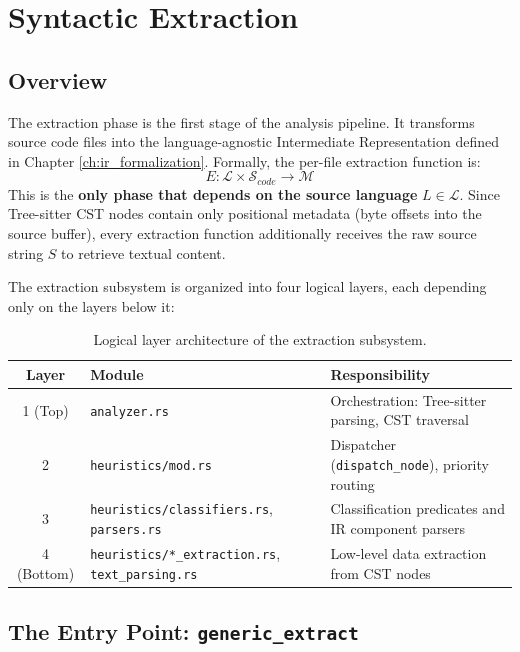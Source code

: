 \chapter{Syntactic Extraction}
\label{ch:extraction}

\section{Overview}
\label{sec:extraction_overview}

The extraction phase is the first stage of the analysis pipeline. It
transforms source code files into the language-agnostic Intermediate
Representation defined in Chapter \ref{ch:ir_formalization}.
Formally, the per-file extraction function is:
$$E : \mathcal{L} \times \mathcal{S}_{code} \to \mathcal{M}$$
This is the \textbf{only phase that depends on the source language}
$L \in \mathcal{L}$. Since Tree-sitter CST nodes contain only
positional metadata (byte offsets into the source buffer), every
extraction function additionally receives the raw source string $S$
to retrieve textual content.

The extraction subsystem is organized into four logical layers, each
depending only on the layers below it:

\begin{table}[htpb]
  \centering
  \begin{tabular}{|c|l|l|}
    \hline
    \textbf{Layer} & \textbf{Module} & \textbf{Responsibility} \\ \hline
    1 (Top) & \texttt{analyzer.rs} & Orchestration: Tree-sitter
    parsing, CST traversal \\ \hline
    2 & \texttt{heuristics/mod.rs} & Dispatcher
    (\texttt{dispatch\_node}), priority routing \\ \hline
    3 & \texttt{heuristics/classifiers.rs}, \texttt{parsers.rs} &
    Classification predicates and IR component parsers \\ \hline
    4 (Bottom) & \texttt{heuristics/*\_extraction.rs},
    \texttt{text\_parsing.rs} & Low-level data extraction from CST
    nodes \\ \hline
  \end{tabular}
  \caption{Logical layer architecture of the extraction subsystem.}
  \label{tab:extraction_layers}
\end{table}

\section{The Entry Point: \texttt{generic\_extract}}
\label{sec:generic_extract}

